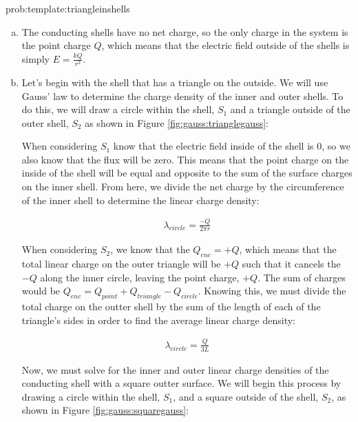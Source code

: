 \begin{solution}{prob:template:triangleinshells}\label{soln:template:triangleinshells}
	
	\begin{enumerate}[(a)]
	
	\item The conducting shells have no net charge, so the only charge in the system is the point charge $Q$, which means that the electric field outside of the shells is simply $E = \frac{kQ}{r^2}$.
	
	\item Let's begin with the shell that has a triangle on the outside. We will use Gauss' law to determine the charge density of the inner and outer shells. To do this, we will draw a circle within the shell, $S_1$ and a triangle outside of the outer shell, $S_2$ as shown in Figure \ref{fig:gauss:trianglegauss}:
	
	
	
	 When considering $S_1$ know that the electric field inside of the shell is $0$, so we also know that the flux will be zero. This means that the point charge on the inside of the shell will be equal and opposite to the sum of the surface charges on the inner shell. From here, we divide the net charge by the circumference of the inner shell to determine the linear charge density:
	
	\begin{align*}
		\lambda_{circle} = \frac{-Q}{2\pi r}
	\end{align*}
		
	When considering $S_2$, we know that the $Q_{enc} = +Q$, which means that the total linear charge on the outer triangle will be $+Q$ such that it cancels the $-Q$ along the inner circle, leaving the point charge, $+Q$. The sum of charges would be $Q_{enc} = Q_{point}+Q_{triangle}-Q_{circle}$. Knowing this, we must divide the total charge on the outter shell by the sum of the length of each of the triangle's sides in order to find the average linear charge density:
	
	\begin{align*}
		\lambda_{circle} = \frac{Q}{3L}
	\end{align*}
	
	Now, we must solve for the inner and outer linear charge densities of the conducting shell with a square outter surface. We will begin this process by drawing a circle within the shell, $S_1$, and a square outside of the shell, $S_2$, as shown in Figure \ref{fig:gauss:squaregauss}:
	

\end{enumerate}
\end{solution}
